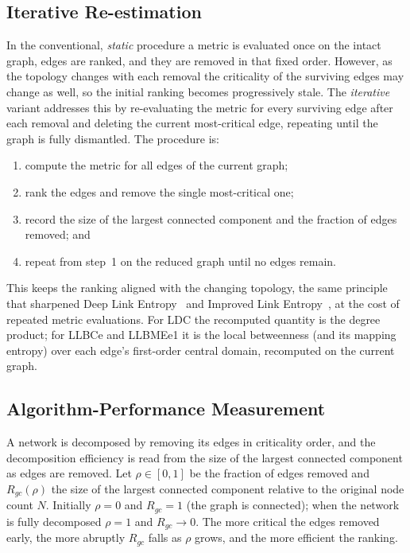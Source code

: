 \documentclass[runningheads,11pt]{article}
\begin{document}
\subsection{Iterative Re-estimation}
\label{sec:iterative}
In the conventional, \emph{static} procedure a metric is evaluated once on the
intact graph, edges are ranked, and they are removed in that fixed order.
However, as the topology changes with each removal the criticality of the
surviving edges may change as well, so the initial ranking becomes progressively
stale. The \emph{iterative} variant addresses this by re-evaluating the metric
for every surviving edge after each removal and deleting the current
most-critical edge, repeating until the graph is fully dismantled. The procedure
is:
\begin{enumerate}
\item compute the metric for all edges of the current graph;
\item rank the edges and remove the single most-critical one;
\item record the size of the largest connected component and the fraction of
edges removed; and
\item repeat from step~1 on the reduced graph until no edges remain.
\end{enumerate}
This keeps the ranking aligned with the changing topology, the same principle
that sharpened Deep Link Entropy~\cite{ozaydin2021deep} and Improved Link
Entropy~\cite{lubashevskiy2023improved}, at the cost of repeated metric
evaluations. For LDC the recomputed quantity is the degree product; for LLBCe
and LLBMEe1 it is the local betweenness (and its mapping entropy) over each
edge's first-order central domain, recomputed on the current graph.

\subsection{Algorithm-Performance Measurement}
\label{sec:auc}
A network is decomposed by removing its edges in criticality order, and the
decomposition efficiency is read from the size of the largest connected
component as edges are removed. Let $\rho\in[0,1]$ be the fraction of edges
removed and $R_{gc}(\rho)$ the size of the largest connected component relative
to the original node count $N$. Initially $\rho=0$ and $R_{gc}=1$ (the graph is
connected); when the network is fully decomposed $\rho=1$ and $R_{gc}\to 0$.
The more critical the edges removed early, the more abruptly $R_{gc}$ falls as
$\rho$ grows, and the more efficient the ranking.
\end{document}
